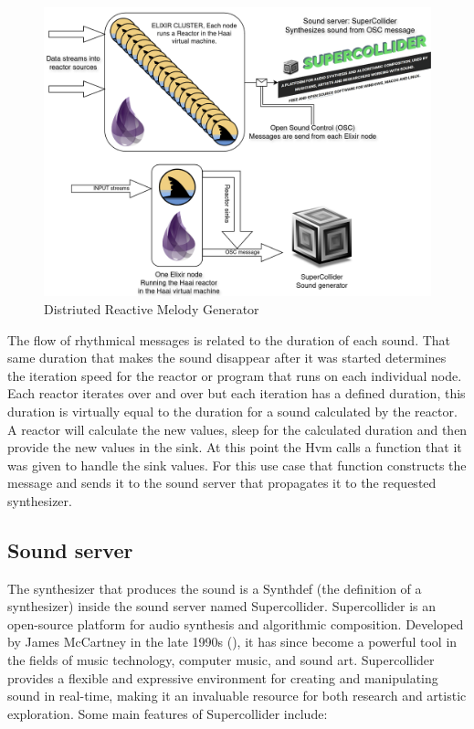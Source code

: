 \documentclass[a4paper]{book}
\begin{document}
\begin{figure}[h]
	\includegraphics[width=\textwidth]{drmg200.drawio}
	\caption{Distriuted Reactive Melody Generator}
	\label{fig:drmg}
\end{figure}
 
The flow of rhythmical messages is related to the duration of each sound. That same duration that makes the sound disappear after it was started determines the iteration speed for the reactor or program that runs on each individual node. Each reactor iterates over and over but each iteration has a defined duration, this duration is virtually equal to the duration for a sound calculated by the reactor. A reactor will calculate the new values, sleep for the calculated duration and then provide the new values in the sink. At this point the Hvm calls a function that it was given to handle the sink values. For this use case that function constructs the message and sends it to the sound server that propagates it to the requested synthesizer. 

\subsection{Sound server}
The synthesizer that produces the sound is a Synthdef (the definition of a synthesizer) inside the sound server named Supercollider. Supercollider is an open-source platform for audio synthesis and algorithmic composition. Developed by James McCartney in the late 1990s (\cite{scBook}), it has since become a powerful tool in the fields of music technology, computer music, and sound art. Supercollider provides a flexible and expressive environment for creating and manipulating sound in real-time, making it an invaluable resource for both research and artistic exploration. Some main features of Supercollider include:
\end{document}
